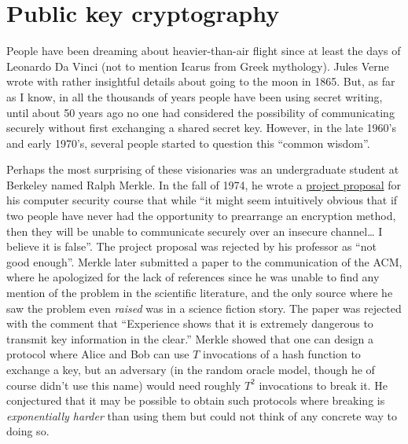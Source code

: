 \chapter{Public key cryptography}\label{10-Public-key-cryptograph}

People have been dreaming about heavier-than-air flight since at least
the days of Leonardo Da Vinci (not to mention Icarus from Greek
mythology). Jules Verne wrote with rather insightful details about going
to the moon in 1865. But, as far as I know, in all the thousands of
years people have been using secret writing, until about 50 years ago no
one had considered the possibility of communicating securely without
first exchanging a shared secret key. However, in the late 1960's and
early 1970's, several people started to question this ``common wisdom''.

Perhaps the most surprising of these visionaries was an undergraduate
student at Berkeley named Ralph Merkle. In the fall of 1974, he wrote a
\href{http://www.merkle.com/1974/}{project proposal} for his computer
security course that while ``it might seem intuitively obvious that if
two people have never had the opportunity to prearrange an encryption
method, then they will be unable to communicate securely over an
insecure channel\ldots{} I believe it is false''. The project proposal
was rejected by his professor as ``not good enough''. Merkle later
submitted a paper to the communication of the ACM, where he apologized
for the lack of references since he was unable to find any mention of
the problem in the scientific literature, and the only source where he
saw the problem even \emph{raised} was in a science fiction story. The
paper was rejected with the comment that ``Experience shows that it is
extremely dangerous to transmit key information in the clear.'' Merkle
showed that one can design a protocol where Alice and Bob can use \(T\)
invocations of a hash function to exchange a key, but an adversary (in
the random oracle model, though he of course didn't use this name) would
need roughly \(T^2\) invocations to break it. He conjectured that it may
be possible to obtain such protocols where breaking is
\emph{exponentially harder} than using them but could not think of any
concrete way to doing so.


